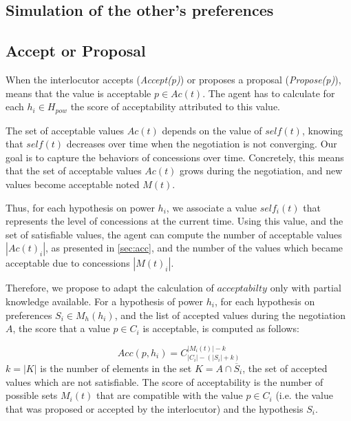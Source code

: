\documentclass[conference, letterpaper]{article}
\begin{document}
	
	
	
	
	

	
		
	
	\subsection*{Simulation of the other's preferences}
	

	\subsection{Accept or Proposal}
		When the interlocutor accepts (\emph{Accept(p)}) or proposes a proposal (\emph{Propose(p)}), means that the value is acceptable $p \in Ac(t)$. 
		The agent has to calculate for each $h_i \in H_{pow}$ the score of acceptability attributed to this value. 
		
		The set of acceptable values $Ac(t)$ depends on the value of $self(t)$, knowing that $self(t)$ decreases over time when the negotiation is not converging. Our goal is to capture the behaviors of concessions over time. Concretely, this means that the set of acceptable values $Ac(t)$ grows during the negotiation, and new values become acceptable noted $M(t)$. 
		
		Thus, for each hypothesis on power $h_i$, we associate a value $self_i(t)$ that represents the level of concessions at the current time. Using this value, and the set of satisfiable values, the agent can compute the number of acceptable values $|Ac(t)_i|$, as presented in \ref{sec:acc}, and the number of the values which became acceptable due to concessions $|M(t)_i|$.
		
		Therefore, we propose to adapt the calculation of $acceptabilty$ only with partial knowledge available. For a hypothesis of power $h_i$, for each hypothesis on preferences $S_i \in M_h(h_i)$, and the list of accepted values during the negotiation $A$, the score that a value $p \in C_i$ is acceptable, is computed as follows:
		
		\begin{equation}
		Acc(p, h_i) = C_{|C_i|-(|S_i| + k)}^{|M_i(t)| - k}
		\end{equation}
		$k = |K| $ is the number of elements in the set $K=A \cap \overline S_i$, the set of accepted values which are not satisfiable. The score of acceptability is the number of possible sets $M_i(t)$ that are compatible with the value $p\in C_i$ (i.e. the value that was proposed or accepted by the interlocutor) and the hypothesis $S_i$.
		
\end{document}
